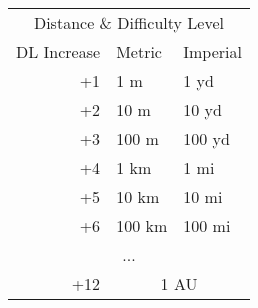 \begin{tabularx}{\marginparwidth}{rXX}
\multicolumn{3}{c}{Distance \& Difficulty Level} \\
DL Increase & Metric & Imperial \\
\hline
+1 & 1 m & 1 yd \\
+2 & 10 m & 10 yd \\
+3 & 100 m & 100 yd \\
+4 & 1 km & 1 mi \\
+5 & 10 km & 10 mi \\
+6 & 100 km & 100 mi \\
\multicolumn{3}{c}{...} \\
+12 & \multicolumn{2}{c}{1 AU}  \\
\end{tabularx}
